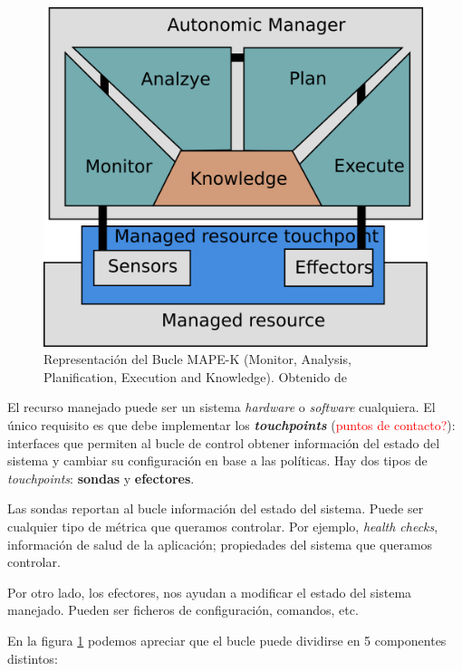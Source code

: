 \begin{figure}[h]
  \centering
  \includegraphics[scale=1.35]{01_introduccion/images/bucle-mape-k}
  \caption[Representación del Bucle MAPE-K (Monitor, Analysis, Planification, Execution and Knowledge)]{Representación del Bucle MAPE-K (Monitor, Analysis, Planification, Execution and Knowledge). Obtenido de \cite{fonsEspecificacionSistemasAutoadaptativos2021}}
  \label{fig:bucle-mapek}
\end{figure}

El recurso manejado puede ser un sistema \emph{hardware} o \emph{software} cualquiera. El único requisito es que debe implementar los \textbf{\emph{touchpoints}} (\textcolor{red}{puntos de contacto?}): interfaces que permiten al bucle de control obtener información del estado del sistema y cambiar su configuración en base a las políticas. Hay dos tipos de \emph{touchpoints}: \textbf{sondas} y \textbf{efectores}.

Las sondas reportan al bucle información del estado del sistema. Puede ser cualquier tipo de métrica que queramos controlar. Por ejemplo, \emph{health checks}, información de salud de la aplicación; propiedades del sistema que queramos controlar.

Por otro lado, los efectores, nos ayudan a modificar el estado del sistema manejado. Pueden ser ficheros de configuración, comandos, etc.

En la figura \ref{fig:bucle-mapek} podemos apreciar que el bucle puede dividirse en 5 componentes distintos: \cite{ibmcorporationArchitecturalBlueprintAutonomic2006}

